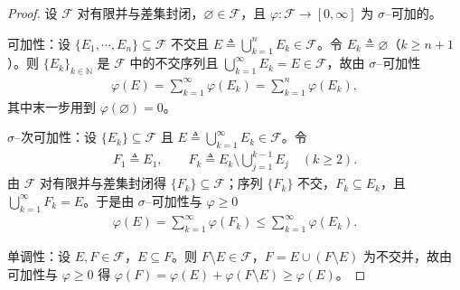 \documentclass[../../main.tex]{subfiles}%
\begin{document}
\begin{proof}
设 $\mathcal{F}$ 对有限并与差集封闭，$\varnothing \in\mathcal{F}$，且 $\varphi:\mathcal{F}\to[0,\infty]$ 为 $\sigma$--可加的。

可加性：设 $\{E_1,\cdots ,E_n\}\subseteq\mathcal{F}$ 不交且 $E\triangleq\bigcup_{k=1}^nE_k\in\mathcal{F}$。令 $E_k\triangleq\varnothing$（$k\geqslant n+1$）。则 $\{E_k\}_{k\in\mathbb{N}}$ 是 $\mathcal{F}$ 中的不交序列且 $\bigcup_{k=1}^\infty E_k=E\in\mathcal{F}$，故由 $\sigma$--可加性
\begin{align*}
\varphi(E)=\sum_{k=1}^\infty\varphi(E_k)=\sum_{k=1}^n\varphi(E_k),
\end{align*}
其中末一步用到 $\varphi(\varnothing )=0$。

$\sigma$--次可加性：设 $\{E_k\}\subseteq\mathcal{F}$ 且 $E\triangleq\bigcup_{k=1}^\infty E_k\in\mathcal{F}$。令
\begin{align*}
F_1\triangleq E_1,\qquad F_k\triangleq E_k\setminus\bigcup_{j=1}^{k-1}E_j\quad(k\geqslant2).
\end{align*}
由 $\mathcal{F}$ 对有限并与差集封闭得 $\{F_k\}\subseteq\mathcal{F}$；序列 $\{F_k\}$ 不交，$F_k\subseteq E_k$，且 $\bigcup_{k=1}^\infty F_k=E$。于是由 $\sigma$--可加性与 $\varphi\geqslant0$
\begin{align*}
\varphi(E)=\sum_{k=1}^\infty\varphi(F_k)\leqslant\sum_{k=1}^\infty\varphi(E_k).
\end{align*}

单调性：设 $E,F\in\mathcal{F}$，$E\subseteq F$。则 $F\setminus E\in\mathcal{F}$，$F=E\cup(F\setminus E)$ 为不交并，故由可加性与 $\varphi\geqslant0$ 得 $\varphi(F)=\varphi(E)+\varphi(F\setminus E)\geqslant\varphi(E)$。
\end{proof}
\end{document}
